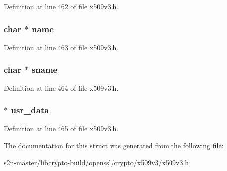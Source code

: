 Definition at line 462 of file x509v3.\+h.

\subsubsection[{\texorpdfstring{name}{name}}]{\setlength{\rightskip}{0pt plus 5cm}char $\ast$ name}\hypertarget{structx509__purpose__st_ad547fb8186b526cb1b588daad4334fbe}{}\label{structx509__purpose__st_ad547fb8186b526cb1b588daad4334fbe}


Definition at line 463 of file x509v3.\+h.

\subsubsection[{\texorpdfstring{sname}{sname}}]{\setlength{\rightskip}{0pt plus 5cm}char $\ast$ sname}\hypertarget{structx509__purpose__st_ad763206d033f7b30a351a0a590f1abee}{}\label{structx509__purpose__st_ad763206d033f7b30a351a0a590f1abee}


Definition at line 464 of file x509v3.\+h.

\subsubsection[{\texorpdfstring{usr\+\_\+data}{usr_data}}]{ $\ast$ usr\+\_\+data}\hypertarget{structx509__purpose__st_a95a5cb4558ce78c8ea8f0ca4209945f8}{}\label{structx509__purpose__st_a95a5cb4558ce78c8ea8f0ca4209945f8}


Definition at line 465 of file x509v3.\+h.



The documentation for this struct was generated from the following file\+:\begin{DoxyCompactItemize}
\item 
s2n-\/master/libcrypto-\/build/openssl/crypto/x509v3/\hyperlink{crypto_2x509v3_2x509v3_8h}{x509v3.\+h}\end{DoxyCompactItemize}
